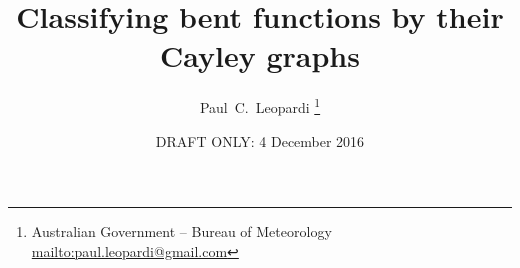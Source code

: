\documentclass[12pt,a4paper]{article}
\title{Classifying bent functions by their Cayley graphs}
\author{
Paul~C.~Leopardi
\thanks{Australian Government -- Bureau of Meteorology
\protect\url{mailto:paul.leopardi@gmail.com}}
}
\date{DRAFT ONLY: 4 December 2016}
\newcommand{\mb}[1]{\mathbb{#1}}
\newcommand{\Z}{\mb{Z}}
\newtheorem{Theorem}{Theorem}
\begin{document}
\maketitle

\begin{abstract}
%
%
\end{abstract}

% 
% 
% 
\end{document}
